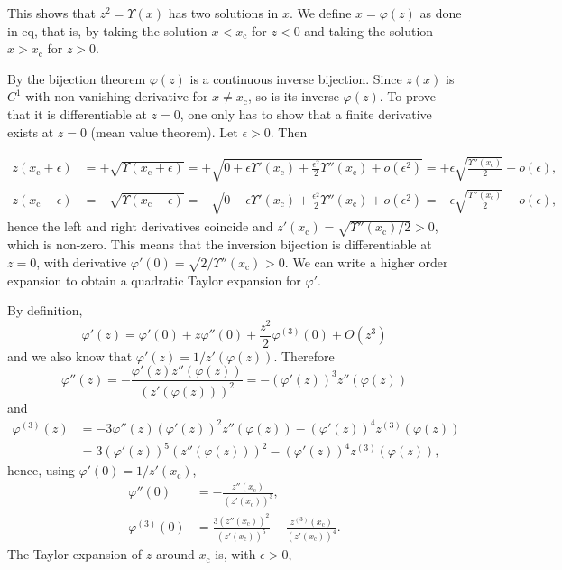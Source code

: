 \documentclass[11pt]{article}
\newcommand{\rc}{\mathrm{c}}
\newcommand{\xc}{x_{\rc}}
\begin{document}
\begin{appendices}
This shows that $z^{2}=\Upsilon(x)$ has two solutions in $x$. We define $x=\varphi(z)$ as done in eq, that is, by taking the solution $x<\xc$ for $z<0$ and taking the solution $x>\xc$ for $z>0$.

By the bijection theorem $\varphi(z)$ is a continuous inverse bijection. Since $z(x)$ is $C^{1}$ with non-vanishing derivative for $x\neq\xc$, so is its inverse $\varphi(z)$. To prove that it is differentiable at $z=0$, one only has to show that a finite derivative exists at $z=0$ (mean value theorem). Let $\epsilon>0$. Then

\begin{align*}
  z(\xc+\epsilon) &= +\sqrt{\Upsilon(\xc+\epsilon)} = +\sqrt{0+\epsilon \Upsilon'(\xc)+\frac{\epsilon^{2}}{2} \Upsilon''(\xc)+o(\epsilon^{2})} =+ \epsilon\sqrt{\frac{\Upsilon''(\xc)}{2}} + o(\epsilon) ,\\
  z(\xc-\epsilon) &= -\sqrt{\Upsilon(\xc-\epsilon)} = -\sqrt{0-\epsilon \Upsilon'(\xc)+\frac{\epsilon^{2}}{2} \Upsilon''(\xc)+o(\epsilon^{2})} = -\epsilon\sqrt{\frac{\Upsilon''(\xc)}{2}} + o(\epsilon) ,
  \end{align*}
hence the left and right derivatives coincide and $z'(\xc)=\sqrt{\Upsilon''(\xc)/2}>0$, which is non-zero. This means that the inversion bijection is differentiable at $z=0$, with derivative $\varphi'(0)=\sqrt{2/\Upsilon''(\xc)}>0$. We can write a higher order expansion to obtain a quadratic Taylor expansion for $\varphi'$.

By definition,
$$\varphi'(z) = \varphi'(0) + z \varphi''(0) + \frac{z^{2}}{2} \varphi^{(3)}(0) + O(z^{3}) $$
and we also know that $\varphi'(z)=1/z'(\varphi(z))$. Therefore
$$\varphi''(z) = -\frac{\varphi'(z)z''(\varphi(z))}{(z'(\varphi(z)))^{2}}
= -(\varphi'(z))^{3} z''(\varphi(z)) $$
and
\begin{align*}
  \varphi^{(3)}(z) &= -3 \varphi''(z)(\varphi'(z))^{2} z''(\varphi(z)) -(\varphi'(z))^{4} z^{(3)}(\varphi(z)) \\
         {}&=3 (\varphi'(z))^{5} (z''(\varphi(z)))^{2} -(\varphi'(z))^{4} z^{(3)}(\varphi(z)) ,
\end{align*}
hence, using $\varphi'(0)=1/z'(\xc)$, 
\begin{align*}
  \varphi''(0) &= -\frac{z''(\xc)}{(z'(\xc))^{3}} ,\\
  \varphi^{(3)}(0) &= \frac{3(z''(\xc))^{2}}{(z'(\xc))^{5}} - \frac{z^{(3)}(\xc)}{(z'(\xc))^{4}} .
\end{align*}
The Taylor expansion of $z$ around $\xc$ is, with $\epsilon>0$,


\end{appendices}
\end{document}
